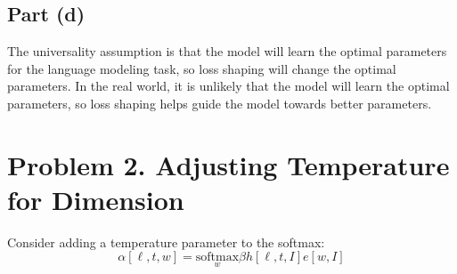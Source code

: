 \documentclass{amsart}
\theoremstyle{definition}
\begin{document}
\subsection*{Part (d)}
The universality assumption is that the model will learn the optimal parameters for the language modeling task,
so loss shaping will change the optimal parameters. 
In the real world, it is unlikely that the model will learn the optimal parameters, so loss shaping helps guide the model towards better parameters.

\section*{Problem 2. Adjusting Temperature for Dimension}
Consider adding a temperature parameter to the softmax:
\[
\alpha[\ell, t, w] = \underset{w}{\mathrm{softmax}} \beta h[\ell, t, I] e[w, I]
\]
\end{document}
